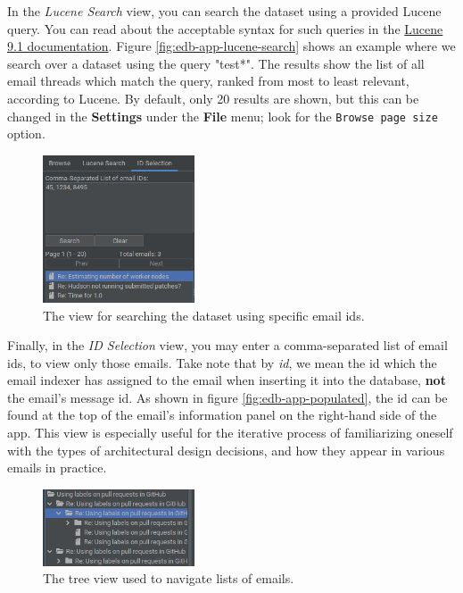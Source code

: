 \documentclass[a4paper, 12pt]{article}
\begin{document}
		
			In the \textit{Lucene Search} view, you can search the dataset using a provided Lucene query. You can read about the acceptable syntax for such queries in the \href{https://lucene.apache.org/core/9_1_0/queryparser/org/apache/lucene/queryparser/classic/package-summary.html}{Lucene 9.1 documentation}. Figure \ref{fig:edb-app-lucene-search} shows an example where we search over a dataset using the query "test*". The results show the list of all email threads which match the query, ranked from most to least relevant, according to Lucene. By default, only 20 results are shown, but this can be changed in the \textbf{Settings} under the \textbf{File} menu; look for the \texttt{Browse page size} option.
			
			\begin{figure}
				\includegraphics[width=0.4\textwidth]{img/edb-app_id-selection.png}
				\caption{The view for searching the dataset using specific email ids.}
				\label{fig:edb-app-id-selection}
			\end{figure}
		
			Finally, in the \textit{ID Selection} view, you may enter a comma-separated list of email ids, to view only those emails. Take note that by \textit{id}, we mean the id which the email indexer has assigned to the email when inserting it into the database, \textbf{not} the email's message id. As shown in figure \ref{fig:edb-app-populated}, the id can be found at the top of the email's information panel on the right-hand side of the app. This view is especially useful for the iterative process of familiarizing oneself with the types of architectural design decisions, and how they appear in various emails in practice.
			
			\begin{figure}
				\includegraphics[width=0.4\textwidth]{img/edb-app_email-tree-view.png}
				\caption{The tree view used to navigate lists of emails.}
				\label{fig:edb-app-tree-view}
			\end{figure}
			
\end{document}
